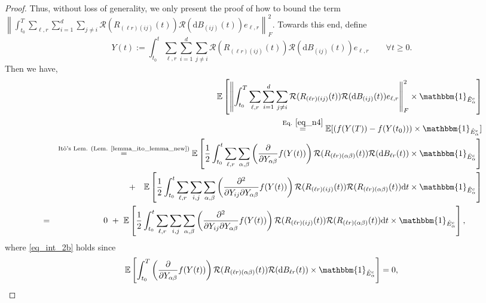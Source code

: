 \documentclass[11pt,letterpaper]{article}
\begin{document}
\begin{proof}
%
Thus, without loss of generality, we only present the proof of how to bound the term\\ $\left\| \int_{t_0}^T \sum_{\ell, r} \sum_{i=1}^{d} \sum_{j \neq i}\mathcal{R}(R_{(\ell r) (i j)}(t))\mathcal{R}(\mathrm{d}B_{(ij)}(t))e_{\ell, r}  \right\|_F^2$.
%
Towards this end, define
%
\begin{equation}\label{eq_n4}
    Y(t):=  \int_{t_0}^t \sum_{\ell, r} \sum_{i=1}^{d} \sum_{j \neq i}\mathcal{R}(R_{(\ell r) (i j)}(t))\mathcal{R}(\mathrm{d}B_{(ij)}(t)) e_{\ell, r}\qquad \forall t\geq 0.
    \end{equation}
%
 Then we have,
%
\begin{eqnarray}\label{eq_int_2b}
       & &  \mathbb{E}\left [\left\| \int_{t_0}^T \sum_{\ell, r} \sum_{i=1}^{d} \sum_{j \neq i}\mathcal{R}(R_{(\ell r) (i j)}(t))\mathcal{R}(\mathrm{d}B_{(ij)}(t)) e_{\ell, r} \right\|_F^2  \times \mathbbm{1}_{\hat{E}_\alpha^c}\right]  \nonumber\\
   & & \stackrel{\textrm{Eq. } \eqref{eq_n4}}{=} \mathbb{E}[(f(Y(T)) - f(Y(t_0)))  \times \mathbbm{1}_{\hat{E}_\alpha^c}] \nonumber\\
     & & \stackrel{\textrm{It\^o's Lem. (Lem. \ref{lemma_ito_lemma_new})}}{=} \mathbb{E}\left [\frac{1}{2} \int_{t_0}^t \sum_{\ell, r} \sum_{\alpha, \beta} \left(\frac{\partial}{ \partial Y_{\alpha \beta}} f(Y(t))\right) \mathcal{R}(R_{(\ell r) (\alpha \beta)}(t)) \mathcal{R}(\mathrm{d}B_{\ell r}(t))  \times \mathbbm{1}_{\hat{E}_\alpha^c} \right] \nonumber\\
     & & + \quad \mathbb{E}\left [\frac{1}{2} \int_{t_0}^t \sum_{\ell, r} \sum_{i,j} \sum_{\alpha, \beta} \left(\frac{\partial^2}{\partial Y_{ij} \partial Y_{\alpha \beta}} f(Y(t))\right) \mathcal{R}(R_{(\ell r) (i j)}(t))  \mathcal{R}(R_{(\ell r) (\alpha \beta)}(t)) \mathrm{d}t  \times \mathbbm{1}_{\hat{E}_\alpha^c} \right] \nonumber\\
        &=& 0 \, \, +  \, \, \mathbb{E}\left [\frac{1}{2} \int_{t_0}^t \sum_{\ell, r} \sum_{i,j} \sum_{\alpha, \beta} \left(\frac{\partial^2}{\partial Y_{ij} \partial Y_{\alpha \beta}} f(Y(t))\right) \mathcal{R}(R_{(\ell r) (i j)}(t)) \mathcal{R}(R_{(\ell r) (\alpha \beta)}(t)) \mathrm{d}t  \times \mathbbm{1}_{\hat{E}_\alpha^c}\right], \qquad
        \end{eqnarray}
        where \eqref{eq_int_2b} holds since $$\mathbb{E}\left[\int_{t_0}^T  \left(\frac{\partial}{ \partial Y_{\alpha \beta}} f(Y(t))\right) \mathcal{R}(R_{(\ell r) (\alpha \beta)}(t)) \mathcal{R}(\mathrm{d}B_{\ell r}(t))  \times \mathbbm{1}_{\hat{E}_\alpha^c} \right] = 0,$$

\end{proof}
\end{document}
